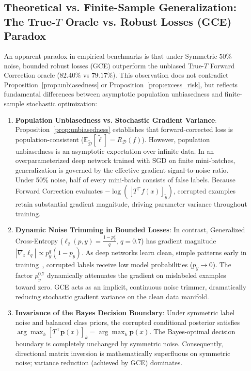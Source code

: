 \documentclass[journal]{IEEEtran}
\theoremstyle{definition}
\begin{document}
\subsection{Theoretical vs. Finite-Sample Generalization: The True-$T$ Oracle vs. Robust Losses (GCE) Paradox}
\label{sec:true_t_vs_gce_theory}
An apparent paradox in empirical benchmarks is that under Symmetric 50\% noise, bounded robust losses (GCE) outperform the unbiased True-$T$ Forward Correction oracle ($82.40\%$ vs $79.17\%$). This observation does not contradict Proposition~\ref{prop:unbiasedness} or Proposition~\ref{prop:excess_risk}, but reflects fundamental differences between asymptotic population unbiasedness and finite-sample stochastic optimization:
\begin{enumerate}
    \item \textbf{Population Unbiasedness vs. Stochastic Gradient Variance}: Proposition~\ref{prop:unbiasedness} establishes that forward-corrected loss is population-consistent ($\mathbb{E}_{\tilde{\mathcal{D}}}[\tilde{\ell}] = R_{\mathcal{D}}(f)$). However, population unbiasedness is an asymptotic expectation over infinite data. In an overparameterized deep network trained with SGD on finite mini-batches, generalization is governed by the effective gradient signal-to-noise ratio. Under 50\% noise, half of every mini-batch consists of false labels. Because Forward Correction evaluates $-\log([T^\top f(x)]_{\tilde{y}})$, corrupted examples retain substantial gradient magnitude, driving parameter variance throughout training.
    \item \textbf{Dynamic Noise Trimming in Bounded Losses}: In contrast, Generalized Cross-Entropy ($\ell_q(p, y) = \frac{1 - p_y^q}{q}$, $q=0.7$) has gradient magnitude $|\nabla_z \ell_q| \propto p_y^q (1 - p_y)$. As deep networks learn clean, simple patterns early in training~\cite{arpit2017closer}, corrupted labels receive low model probabilities ($p_{\tilde{y}} \to 0$). The factor $p_{\tilde{y}}^{0.7}$ dynamically attenuates the gradient on mislabeled examples toward zero. GCE acts as an implicit, continuous noise trimmer, dramatically reducing stochastic gradient variance on the clean data manifold.
    \item \textbf{Invariance of the Bayes Decision Boundary}: Under symmetric label noise and balanced class priors, the corrupted conditional posterior satisfies $\arg\max_k [T^\top \mathbf{p}(x)]_k = \arg\max_k \mathbf{p}(x)$. The Bayes-optimal decision boundary is completely unchanged by symmetric noise. Consequently, directional matrix inversion is mathematically superfluous on symmetric noise; variance reduction (achieved by GCE) dominates.

\end{enumerate}
\end{document}
